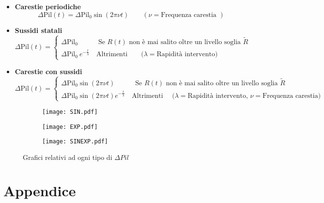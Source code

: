 \begin{itemize}
	\item \textbf{Carestie periodiche}\\
\begin{equation}
	\Delta\text{Pil}(t)=\Delta\text{Pil}_0\sin(2\pi\nu t) \qquad (\nu=\text{Frequenza carestia })
\end{equation}
\item \textbf{Sussidi statali}\\
\begin{equation}
	\Delta\text{Pil}(t)=
	\begin{cases}
		\Delta\text{Pil}_0 \qquad \quad \text{Se $R(t)$ non è mai salito oltre un livello soglia $\tilde{R}$}\\
		\Delta\text{Pil}_0\ e^{-\frac{t}{\lambda}} \quad \text{Altrimenti}\qquad     \text{($\lambda=$Rapidità intervento)}
	\end{cases}
\end{equation}
\item \textbf{Carestie con sussidi}
\begin{equation}
	\Delta\text{Pil}(t)=
	\begin{cases}
		\Delta\text{Pil}_0\sin(2\pi\nu t) \qquad \quad \text{Se $R(t)$ non è mai salito oltre un livello soglia $\tilde{R}$}\\
		\Delta\text{Pil}_0\sin(2\pi\nu t)e^{-\frac{t}{\lambda}} \quad \text{Altrimenti}\quad     \text{ ($\lambda=$Rapidità intervento, $\nu=$Frequenza carestia)}
	\end{cases}
\end{equation}
\end{itemize}
\begin{figure}[H]
	\centering
	\begin{subfigure}[H]{0.5\textwidth}
		\centering
		\texttt{[image: SIN.pdf]}
	\end{subfigure}
	\hfill
	\begin{subfigure}[H]{0.5\textwidth}
		\centering
		\texttt{[image: EXP.pdf]}
	\end{subfigure}
	\hfill
	\begin{subfigure}[H]{0.5\textwidth}
		\centering
		\texttt{[image: SINEXP.pdf]}
	\end{subfigure}
	\caption{Grafici relativi ad ogni tipo di $ \Delta Pil$}
\end{figure}
\newpage
\appendix
\section*{Appendice}
